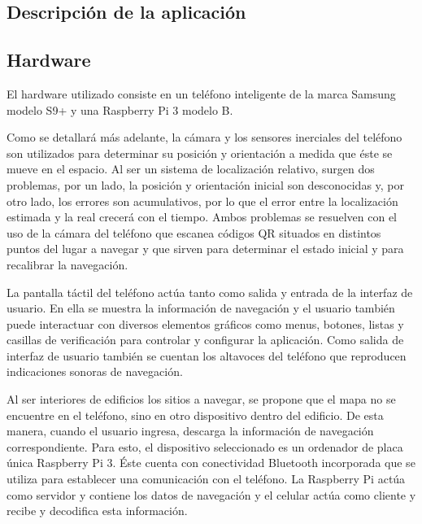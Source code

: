 \documentclass{article}
\newenvironment{standalone}{\begin{preview}}{\end{preview}}
\begin{document}
\begin{standalone}

  \section{Descripción de la aplicación}

  \subsection{Hardware}

  El hardware utilizado consiste en un teléfono inteligente de la marca Samsung modelo S9+ y una Raspberry Pi 3 modelo B.

  Como se detallará más adelante, la cámara y los sensores inerciales del teléfono son utilizados para determinar su posición y orientación a medida que éste se mueve en el espacio.
  Al ser un sistema de localización relativo, surgen dos problemas, por un lado, la posición y orientación inicial son desconocidas y, por otro lado, los errores son acumulativos, por lo que el error entre la localización estimada y la real crecerá con el tiempo.
  Ambos problemas se resuelven con el uso de la cámara del teléfono que escanea códigos QR situados en distintos puntos del lugar a navegar y que sirven para determinar el estado inicial y para recalibrar la navegación.

  La pantalla táctil del teléfono actúa tanto como salida y entrada de la interfaz de usuario.
  En ella se muestra la información de navegación y el usuario también puede interactuar con diversos elementos gráficos como menus, botones, listas y casillas de verificación para controlar y configurar la aplicación.
  Como salida de interfaz de usuario también se cuentan los altavoces del teléfono que reproducen indicaciones sonoras de navegación.

  Al ser interiores de edificios los sitios a navegar, se propone que el mapa no se encuentre en el teléfono, sino en otro dispositivo dentro del edificio.
  De esta manera, cuando el usuario ingresa, descarga la información de navegación correspondiente.
  Para esto, el dispositivo seleccionado es un ordenador de placa única Raspberry Pi 3.
  Éste cuenta con conectividad Bluetooth incorporada que se utiliza para establecer una comunicación con el teléfono.
  La Raspberry Pi actúa como servidor y contiene los datos de navegación y el celular actúa como cliente y recibe y decodifica esta información.


\end{standalone}
\end{document}
